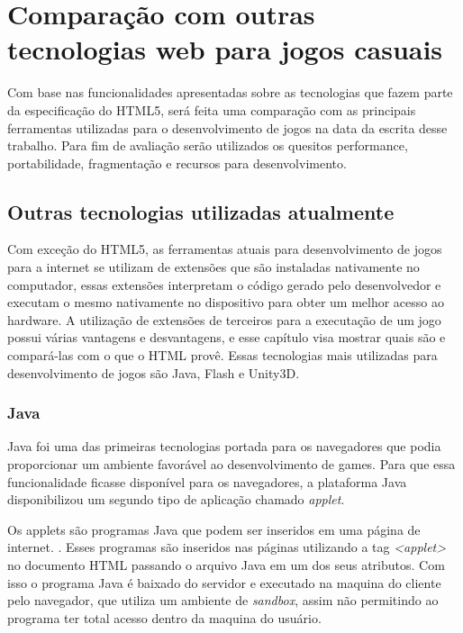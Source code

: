 \section{Comparação com outras tecnologias web para jogos casuais}

Com base nas funcionalidades apresentadas sobre as tecnologias que
fazem parte da especificação do HTML5, será feita uma comparação com
as principais ferramentas utilizadas para o desenvolvimento de jogos
na data da escrita desse trabalho. Para fim de avaliação serão
utilizados os quesitos performance, portabilidade, fragmentação e recursos para
desenvolvimento.

\subsection{Outras tecnologias utilizadas atualmente}

Com exceção do HTML5, as ferramentas atuais para desenvolvimento de jogos para a internet se
utilizam de extensões que são instaladas nativamente no computador,
essas extensões interpretam o código gerado pelo desenvolvedor e
executam o mesmo nativamente no dispositivo para obter um melhor
acesso ao hardware. A utilização de extensões de terceiros para a
executação de um jogo possui várias vantagens e desvantagens, e esse
capítulo visa mostrar quais são e compará-las com o que o HTML provê.
Essas tecnologias mais utilizadas para desenvolvimento de jogos são
Java, Flash e Unity3D.

\subsubsection{Java}

Java foi uma das primeiras tecnologias portada para os navegadores que podia proporcionar um
ambiente favorável ao desenvolvimento de games. Para que essa funcionalidade ficasse disponível para os
navegadores, a plataforma Java disponibilizou um segundo tipo de
aplicação chamado \textit{applet}.

Os applets são programas Java que podem ser inseridos em uma página de
internet. \cite{boese2009introduction}. Esses programas são inseridos nas
páginas utilizando a tag \textit{<applet>} no documento HTML passando
o arquivo Java em um dos seus atributos. Com isso o programa Java é
baixado do servidor e executado na maquina do cliente pelo navegador,
que utiliza um ambiente de \textit{sandbox}, assim não permitindo
ao programa ter total acesso dentro da maquina do usuário.

